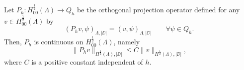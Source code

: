
\begin{lemma}\label{lemma:prob1_orthproj}
Let $P_h: H^{\frac 12}_{00}(\Lambda) \longrightarrow Q_h$ be the orthogonal projection operator defined  for any $v \in H^{\frac 12}_{00}(\Lambda)$ by
\begin{equation*}
(P_h v , \psi)_{\Lambda,|\DD|}= (v, \psi)_{\Lambda , |\DD|} \qquad \forall \psi \in Q_h.  
\end{equation*} 
Then, $P_h$ is continuous on $H^{\frac 12}_{00}(\Lambda)$, namely
\begin{equation*}
\|P_h v\|_{H^{\frac 12}(\Lambda),|\DD|} \leq C \|v\|_{H^{\frac 12}(\Lambda),|\DD|},
\end{equation*}
where $C$ is a positive constant independent of $h$.
\end{lemma}

